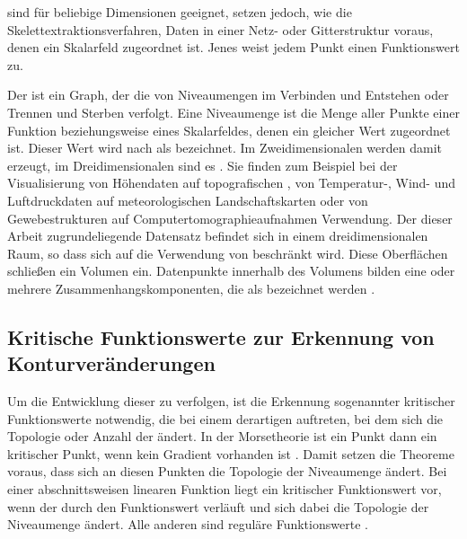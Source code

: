  sind für beliebige Dimensionen geeignet, setzen jedoch, wie die Skelettextraktionsverfahren, Daten in einer Netz- oder Gitterstruktur voraus, denen ein Skalarfeld zugeordnet ist. Jenes weist jedem Punkt einen Funktionswert zu.

Der  ist ein Graph, der die  von Niveaumengen im Verbinden und Entstehen oder Trennen und Sterben verfolgt. Eine Niveaumenge ist die Menge aller Punkte einer Funktion beziehungsweise eines Skalarfeldes, denen ein gleicher Wert zugeordnet ist. Dieser Wert wird nach \cite[S.~1]{carr2010flexibleIsosurfaces} als  bezeichnet. Im Zweidimensionalen werden damit  erzeugt, im Dreidimensionalen sind es . Sie finden zum Beispiel bei der Visualisierung von Höhendaten auf topografischen \cite{hurni2010landform} \cite{openstreetmapContours}, von Temperatur-, Wind- und Luftdruckdaten auf meteorologischen Landschaftskarten \cite{hopkins1996weather} oder von Gewebestrukturen auf Computertomographieaufnahmen \cite{tang2014ctImages} Verwendung.
Der dieser Arbeit zugrundeliegende Datensatz befindet sich in einem dreidimensionalen Raum, so dass sich auf die Verwendung von  beschränkt wird. Diese Oberflächen schließen ein Volumen ein. Datenpunkte innerhalb des Volumens bilden eine oder mehrere Zusammenhangskomponenten, die als  bezeichnet werden \cite[S.~2]{carr2001computingCountourTrees}.

\subsection*{Kritische Funktionswerte zur Erkennung von Konturveränderungen}
Um die Entwicklung dieser  zu verfolgen, ist die Erkennung sogenannter kritischer Funktionswerte notwendig, die bei einem derartigen  auftreten, bei dem sich die Topologie oder Anzahl der  ändert. In der Morsetheorie ist ein Punkt dann ein kritischer Punkt, wenn kein Gradient vorhanden ist  \cite{milnor1963morse} \cite{shinagawa1991surfaceBasedOnMorse}. Damit setzen die Theoreme voraus, dass sich an diesen Punkten die Topologie der Niveaumenge ändert. Bei einer abschnittsweisen linearen Funktion liegt ein kritischer Funktionswert vor, wenn der  durch den Funktionswert verläuft und sich dabei die Topologie der Niveaumenge ändert. Alle anderen sind reguläre Funktionswerte \cite{carr2010flexibleIsosurfaces} \cite{chiang2005contourTreesUsingMonotonePaths}.

